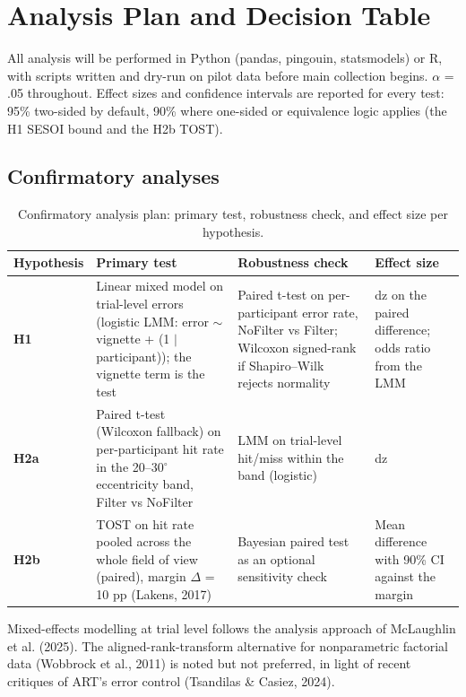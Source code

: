 \section{Analysis Plan and Decision Table}

All analysis will be performed in Python (pandas, pingouin, statsmodels) or R, with scripts written
and dry-run on pilot data before main collection begins. $\alpha$ = .05 throughout. Effect sizes and
confidence intervals are reported for every test: 95\% two-sided by default, 90\% where one-sided or
equivalence logic applies (the H1 SESOI bound and the H2b TOST).

\subsection{Confirmatory analyses}

\begin{longtable}{p{}|p{}|p{}|p{}}
\caption{Confirmatory analysis plan: primary test, robustness check, and effect size per hypothesis.}\\
\hline
\textbf{Hypothesis} & \textbf{Primary test} & \textbf{Robustness check} & \textbf{Effect size} \\
\hline
\endhead
\hline
\textbf{H1} & Linear mixed model on trial-level errors (logistic LMM: error $\sim$ vignette + (1 $\mid$ participant)); the vignette term is the test & Paired t-test on per-participant error rate, NoFilter vs Filter; Wilcoxon signed-rank if Shapiro–Wilk rejects normality & dz on the paired difference; odds ratio from the LMM \\
\textbf{H2a} & Paired t-test (Wilcoxon fallback) on per-participant hit rate in the 20–30$^{\circ}$ eccentricity band, Filter vs NoFilter & LMM on trial-level hit/miss within the band (logistic) & dz \\
\textbf{H2b} & TOST on hit rate pooled across the whole field of view (paired), margin $\Delta$ = 10 pp (Lakens, 2017) & Bayesian paired test as an optional sensitivity check & Mean difference with 90\% CI against the margin \\
\hline
\end{longtable}

Mixed-effects modelling at trial level follows the analysis approach of McLaughlin et al. (2025). The
aligned-rank-transform alternative for nonparametric factorial data (Wobbrock et al., 2011) is noted
but not preferred, in light of recent critiques of ART's error control (Tsandilas \& Casiez, 2024).

